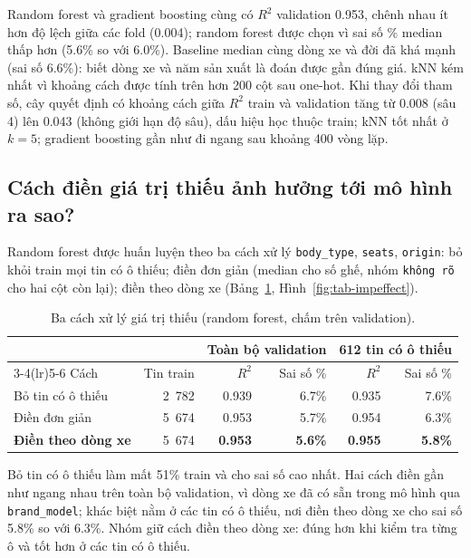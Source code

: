 Random forest và gradient boosting cùng có $R^2$ validation 0.953, chênh nhau ít hơn độ lệch giữa các fold (0.004);
random forest được chọn vì sai số \% median thấp hơn (5.6\% so với 6.0\%). Baseline median cùng dòng xe và đời đã khá
mạnh (sai số 6.6\%): biết dòng xe và năm sản xuất là đoán được gần đúng giá. kNN kém nhất vì khoảng cách được tính trên
hơn 200 cột sau one-hot. Khi thay đổi tham số, cây quyết định có khoảng cách giữa $R^2$ train và validation tăng từ
0.008 (sâu 4) lên 0.043 (không giới hạn độ sâu), dấu hiệu học thuộc train; kNN tốt nhất ở $k = 5$; gradient boosting
gần như đi ngang sau khoảng 400 vòng lặp.

\subsection{Cách điền giá trị thiếu ảnh hưởng tới mô hình ra sao?}\label{sec:tab-impeffect}

Random forest được huấn luyện theo ba cách xử lý \texttt{body\_type}, \texttt{seats}, \texttt{origin}: bỏ khỏi train mọi
tin có ô thiếu; điền đơn giản (median cho số ghế, nhóm \texttt{không rõ} cho hai cột còn lại); điền theo dòng xe
(Bảng~\ref{tab:tab-impeffect}, Hình~\ref{fig:tab-impeffect}).

\begin{table}[H]\centering
\caption{Ba cách xử lý giá trị thiếu (random forest, chấm trên validation).}\label{tab:tab-impeffect}
\begin{tabular}{lrrrrr}
\toprule
& & \multicolumn{2}{c}{Toàn bộ validation} & \multicolumn{2}{c}{612 tin có ô thiếu} \\
\cmidrule(lr){3-4}\cmidrule(lr){5-6}
Cách & Tin train & $R^2$ & Sai số \% & $R^2$ & Sai số \% \\
\midrule
Bỏ tin có ô thiếu & 2~782 & 0.939 & 6.7\% & 0.935 & 7.6\% \\
Điền đơn giản & 5~674 & 0.953 & 5.7\% & 0.954 & 6.3\% \\
\textbf{Điền theo dòng xe} & 5~674 & \textbf{0.953} & \textbf{5.6\%} & \textbf{0.955} & \textbf{5.8\%} \\
\bottomrule
\end{tabular}
\end{table}


Bỏ tin có ô thiếu làm mất 51\% train và cho sai số cao nhất. Hai cách điền gần như ngang nhau trên toàn bộ validation,
vì dòng xe đã có sẵn trong mô hình qua \texttt{brand\_model}; khác biệt nằm ở các tin có ô thiếu, nơi điền theo dòng xe
cho sai số 5.8\% so với 6.3\%. Nhóm giữ cách điền theo dòng xe: đúng hơn khi kiểm tra từng ô và tốt hơn ở các tin có ô
thiếu.

